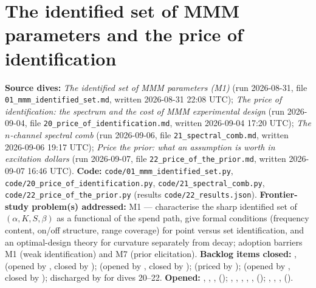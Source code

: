 \chapter[The identified set and the price of identification]{The identified set of MMM parameters and the price of identification}
\label{ch:identification}

\begin{provenance}
\textbf{Source dives:}  \emph{The identified set of MMM parameters (M1)} (run 2026-08-31, file \texttt{01\_mmm\_identified\_set.md}, written 2026-08-31 22:08 UTC);  \emph{The price of identification: the spectrum and the cost of MMM experimental design} (run 2026-09-04, file \texttt{20\_price\_of\_identification.md}, written 2026-09-04 17:20 UTC);  \emph{The $n$-channel spectral comb} (run 2026-09-06, file \texttt{21\_spectral\_comb.md}, written 2026-09-06 19:17 UTC);  \emph{Price the prior: what an assumption is worth in excitation dollars} (run 2026-09-07, file \texttt{22\_price\_of\_the\_prior.md}, written 2026-09-07 16:46 UTC).
\textbf{Code:} \texttt{code/01\_mmm\_identified\_set.py}, \texttt{code/20\_price\_of\_identification.py}, \texttt{code/21\_spectral\_comb.py}, \texttt{code/22\_price\_of\_the\_prior.py} (results \texttt{code/22\_results.json}).
\textbf{Frontier-study problem(s) addressed:} M1 --- characterise the sharp identified set of $(\alpha, K, S, \beta)$ as a functional of the spend path, give formal conditions (frequency content, on/off structure, range coverage) for point versus set identification, and an optimal-design theory for curvature separately from decay; adoption barriers M1 (weak identification) and M7 (prior elicitation).
\textbf{Backlog items closed:} ,  (opened by , closed by );  (opened by , closed by );  (priced by );  (opened by , closed by );  discharged by  for dives 20--22. \textbf{Opened:} , , ,  (); , , , , ,  (); , , ,  ().
\end{provenance}

